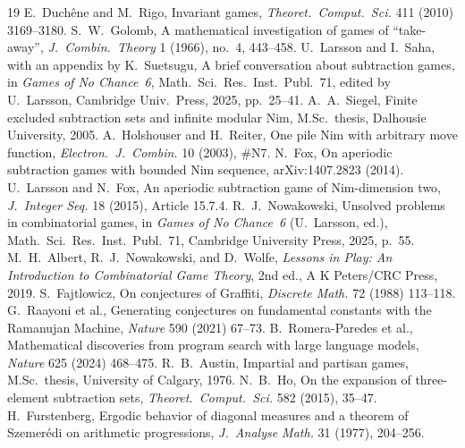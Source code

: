 \begin{thebibliography}{19}
 E.~Duch\^ene and M.~Rigo, Invariant games,
  \emph{Theoret.\ Comput.\ Sci.} 411 (2010) 3169--3180.
 S.~W.~Golomb, A mathematical investigation of games of
  ``take-away'', \emph{J.~Combin.\ Theory} 1 (1966), no.~4, 443--458.
 U.~Larsson and I.~Saha, with an appendix by
  K.~Suetsugu, A brief conversation about subtraction games, in
  \emph{Games of No Chance~6}, Math.\ Sci.\ Res.\ Inst.\ Publ.\ 71,
  edited by U.~Larsson, Cambridge Univ.\ Press, 2025, pp.~25--41.
 A.~A.~Siegel, Finite excluded subtraction sets
  and infinite modular Nim, M.Sc.\ thesis, Dalhousie University, 2005.
 A.~Holshouser and H.~Reiter, One pile Nim with
  arbitrary move function, \emph{Electron.\ J.~Combin.} 10 (2003), \#N7.
 N.~Fox, On aperiodic subtraction games with bounded Nim
  sequence, arXiv:1407.2823 (2014).
 U.~Larsson and N.~Fox, An aperiodic subtraction
  game of Nim-dimension two, \emph{J.~Integer Seq.} 18 (2015), Article
  15.7.4.
 R.~J.~Nowakowski, Unsolved problems in combinatorial
  games, in \emph{Games of No Chance~6} (U.~Larsson, ed.), Math.\ Sci.\
  Res.\ Inst.\ Publ.\ 71, Cambridge University Press, 2025, p.~55.
\bibitem{lessons} M.~H.~Albert, R.~J.~Nowakowski, and D.~Wolfe,
  \emph{Lessons in Play: An Introduction to Combinatorial Game Theory},
  2nd ed., A K Peters/CRC Press, 2019.
 S.~Fajtlowicz, On conjectures of Graffiti,
  \emph{Discrete Math.} 72 (1988) 113--118.
 G.~Raayoni et al., Generating conjectures
  on fundamental constants with the Ramanujan Machine, \emph{Nature}
  590 (2021) 67--73.
 B.~Romera-Paredes et al., Mathematical discoveries
  from program search with large language models, \emph{Nature} 625
  (2024) 468--475.
 R.~B.~Austin, Impartial and partisan games,
  M.Sc.\ thesis, University of Calgary, 1976.
 N.~B.~Ho, On the expansion of three-element
  subtraction sets, \emph{Theoret.\ Comput.\ Sci.} 582 (2015), 35--47.
\bibitem{furstenberg} H.~Furstenberg, Ergodic behavior of diagonal
  measures and a theorem of Szemer\'edi on arithmetic progressions,
  \emph{J.~Analyse Math.} 31 (1977), 204--256.

\end{thebibliography}
